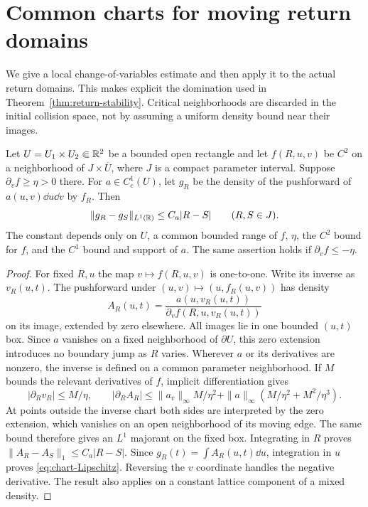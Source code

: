 \section{Common charts for moving return domains}
\label{sec:common-charts}
We give a local change-of-variables estimate and then apply it to the
actual return domains. This makes explicit the domination used in
Theorem~\ref{thm:return-stability}. Critical neighborhoods are discarded
in the initial collision space, not by assuming a uniform density bound
near their images.

\begin{lemma}
\label{lem:common-submersion-chart}
Let $U=U_1\times U_2\Subset\mathbb R^2$ be a bounded open rectangle and let
$f(R,u,v)$ be $C^2$ on a neighborhood of $J\times\overline U$, where
$J$ is a compact parameter interval. Suppose
$\partial_v f\ge\eta>0$ there. For $a\in C_c^1(U)$, let $g_R$ be the
density of the pushforward of $a(u,v)\dd u\dd v$ by $f_R$. Then
\begin{equation}\label{eq:chart-Lipschitz}
 \|g_R-g_S\|_{L^1(\R)}\le C_a|R-S|\qquad(R,S\in J).
\end{equation}
The constant depends only on $U$, a common bounded range of $f$, $\eta$,
the $C^2$ bound for $f$, and the $C^1$ bound and support of $a$.
The same assertion holds if $\partial_v f\le-\eta$.
\end{lemma}
\begin{proof}
For fixed $R,u$ the map $v\mapsto f(R,u,v)$ is one-to-one. Write its
inverse as $v_R(u,t)$. The pushforward under $(u,v)\mapsto(u,f_R(u,v))$
has density
\[
 A_R(u,t)=\frac{a(u,v_R(u,t))}{\partial_v f(R,u,v_R(u,t))}
\]
on its image, extended by zero elsewhere. All images lie in one bounded
$(u,t)$ box. Since $a$ vanishes on a fixed neighborhood of $\partial U$,
this zero extension introduces no boundary jump as $R$ varies. Wherever
$a$ or its derivatives are nonzero, the inverse is defined on a common
parameter neighborhood. If $M$ bounds the relevant derivatives of $f$,
implicit differentiation gives
\[
 |\partial_R v_R|\le M/\eta,\qquad
 |\partial_R A_R|
 \le \|a_v\|_\infty M/\eta^2
       +\|a\|_\infty(M/\eta^2+M^2/\eta^3).
\]
At points outside the inverse chart both sides are interpreted by the
zero extension, which vanishes on an open neighborhood of its moving
edge. The same bound therefore gives an $L^1$ majorant on the fixed box.
Integrating in $R$ proves
$\|A_R-A_S\|_1\le C_a|R-S|$. Since
$g_R(t)=\int A_R(u,t)\dd u$, integration in $u$ proves
\eqref{eq:chart-Lipschitz}. Reversing the $v$ coordinate handles the
negative derivative. The result also applies on a constant lattice
component of a mixed density.
\end{proof}

